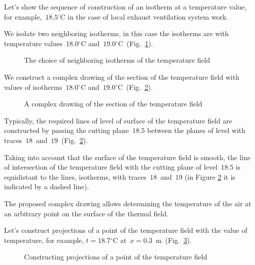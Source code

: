 \documentclass[12pt,twoside]{article}
\newcommand{\FigRef}[2][]{(Fig.~\ref{#2}\textit{#1})}
\newcommand{\degC}{{}^{\circ}\text{C}} %
\begin{document}
\begin{JGGarticle}
			Let's show the sequence of construction of an isotherm at a temperature value, for example,~$18.5\degC$ in the case of local exhaust ventilation system work.
			
			We isolate two neighboring isotherms, in this case the isotherms are with temperature values~$18.0\degC$ and~$19.0\degC$~\FigRef{fig:t_isothrm}.
			\begin{figure}[!hbt]
				\caption{The choice of neighboring isotherms of the temperature field}
				\label{fig:t_isothrm}
			\end{figure}
		
			We construct a complex drawing of the section of the temperature field with values of isotherms~$18.0\degC$ and~$19.0\degC$~\FigRef{fig:t_complex}.
			\begin{figure}[!hbt]
				\caption{A complex drawing of the section of the temperature field}
				\label{fig:t_complex}
			\end{figure}
		
			Typically, the required lines of level of surface of the temperature field are constructed by passing the cutting plane~$18.5$ between the planes of level with traces~$18$~and~$19$~\FigRef{fig:t_complex}.
			
			Taking into account that the surface of the temperature field is smooth, the line of intersection of the temperature field with the cutting plane of level~$18.5$ is equidistant to the lines, isotherms, with traces~$18$~and~$19$ (in Figure \ref{fig:t_complex} it is indicated by a dashed line).
			
			The proposed complex drawing allows determining the temperature of the air at an arbitrary point on the surface of the thermal field.
			
			Let's construct projections of a point of the temperature field with the value of temperature, for example, $t = 18.7\degC$ at~$x = 0.3$~m~\FigRef{fig:t_constr_proj_point}.
			\begin{figure}[!hbt]
				\caption{Constructing projections of a point of the temperature field}
				\label{fig:t_constr_proj_point}
			\end{figure}
			

\end{JGGarticle}
\end{document}
